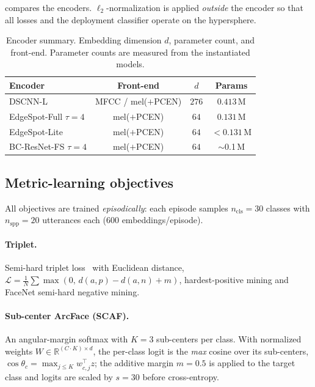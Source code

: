 \documentclass[10pt,twocolumn]{article}
\newcommand{\R}{\mathbb{R}}
\begin{document}
 compares the encoders. $\ell_2$-normalization is applied
\emph{outside} the encoder so that all losses and the deployment classifier
operate on the hypersphere.

\begin{table}[t]
\centering
\caption{Encoder summary. Embedding dimension $d$, parameter count, and
front-end. Parameter counts are measured from the instantiated models.}
\label{tab:encoders}
\small
\begin{tabular}{lccc}
\toprule
\textbf{Encoder} & \textbf{Front-end} & \textbf{$d$} & \textbf{Params} \\
\midrule
DSCNN-L              & MFCC / mel($+$PCEN) & $276$ & $0.413$\,M \\
EdgeSpot-Full $\tau{=}4$ & mel($+$PCEN)    & $64$  & $0.131$\,M \\
EdgeSpot-Lite       & mel($+$PCEN)        & $64$  & $<0.131$\,M \\
BC-ResNet-FS $\tau{=}4$  & mel($+$PCEN)    & $64$  & $\sim$0.1\,M \\
\bottomrule
\end{tabular}
\end{table}

\subsection{Metric-learning objectives}\label{sec:losses}

All objectives are trained \emph{episodically}: each episode samples
$n_{\text{cls}}{=}30$ classes with $n_{\text{spp}}{=}20$ utterances each
($600$ embeddings/episode).

\paragraph{Triplet.}
Semi-hard triplet loss~\cite{schroff2015facenet} with Euclidean distance,
$\mathcal{L}=\frac{1}{N}\sum\max(0,\,d(a,p)-d(a,n)+m)$, hardest-positive mining
and FaceNet semi-hard negative mining.

\paragraph{Sub-center ArcFace (SCAF).}
An angular-margin softmax with $K{=}3$ sub-centers per class. With normalized
weights $W\!\in\!\R^{(C\cdot K)\times d}$, the per-class logit is the
\emph{max} cosine over its sub-centers, $\cos\theta_c=\max_{j\le K} w_{c,j}^{\!\top} z$;
the additive margin $m{=}0.5$ is applied to the target class and logits are
scaled by $s{=}30$ before cross-entropy.
\end{document}
